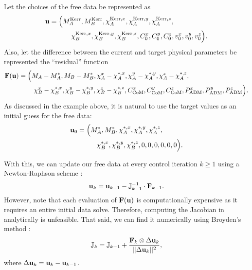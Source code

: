 \documentclass{../document}
\begin{document}
      Let the choices of the free data be represented as
      \begin{equation} \label{eq:u}
        \begin{aligned}
          {\bf u}
          = \Big(
            M^\text{Kerr}_A,
            M^\text{Kerr}_B,
            \chi^{\text{Kerr},x}_A, \chi^{\text{Kerr},y}_A, \chi^{\text{Kerr},z}_A, \qquad\qquad\quad \\
            \chi^{\text{Kerr},x}_B, \chi^{\text{Kerr},y}_B, \chi^{\text{Kerr},z}_B,
            C_0^x, C_0^y, C_0^z,
            v_0^x, v_0^y, v_0^z
          \Big).
        \end{aligned}
      \end{equation}
      Also, let the difference between the current and target physical parameters be represented the ``residual'' function
      \begin{equation}
        \begin{aligned}
          {\bf F}({\bf u})
          = \Big(
            M_A - M^*_A,
            M_B - M^*_B,
            \chi^x_A - \chi^{*,x}_A, \chi^y_A - \chi^{*,y}_A, \chi^z_A - \chi^{*,z}_A, \qquad\qquad\qquad\qquad\quad \\
            \chi^x_B - \chi^{*,x}_B, \chi^y_B - \chi^{*,y}_B, \chi^z_B - \chi^{*,z}_B,
            C_\text{CoM}^x, C_\text{CoM}^y, C_\text{CoM}^z,
            P_\text{ADM}^x, P_\text{ADM}^y, P_\text{ADM}^z
          \Big).
        \end{aligned}
      \end{equation}
      As discussed in the example above, it is natural to use the target values as an initial guess for the free data:
      \begin{equation} \label{eq:u0}
        \begin{aligned}
          {\bf u}_0
          = \Big(
            M^*_A,
            M^*_B,
            \chi^{*,x}_A, \chi^{*,y}_A, \chi^{*,z}_A, \qquad\quad \\
            \chi^{*,x}_B, \chi^{*,y}_B, \chi^{*,z}_B,
            0, 0, 0,
            0, 0, 0
          \Big).
        \end{aligned}
      \end{equation}

      With this, we can update our free data at every control iteration $k \geq 1$ using a Newton-Raphson scheme \cite{NumericalRecipes}:
      \begin{equation}\label{eq:u-iteration}
        {\bf u}_k = {\bf u}_{k-1} - \mathbb{J}^{-1}_{k-1} \cdot {\bf F}_{k-1}.
      \end{equation}
      However, note that each evaluation of ${\bf F}({\bf u})$ is computationally expensive as it requires an entire initial data solve. Therefore, computing the Jacobian in \eq{\eqref{eq:u-iteration}} analytically is unfeasible. That said, we can find it numerically using Broyden's method \cite{NumericalRecipes}:
      \begin{equation}\label{eq:J-iteration}
        \mathbb{J}_k = \mathbb{J}_{k-1} + \frac{{\bf F}_k \otimes \Delta {\bf u}_k}{||\Delta {\bf u}_k||^2},
      \end{equation}
      where $\Delta {\bf u}_k = {\bf u}_k - {\bf u}_{k-1}$.
\end{document}
